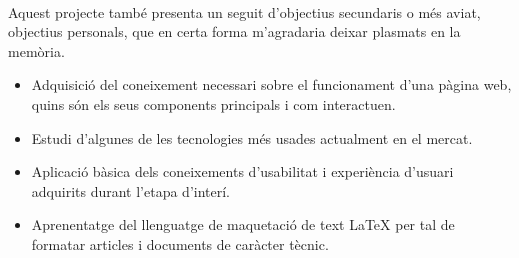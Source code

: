     \paragraph{}
    Aquest projecte també presenta un seguit d’objectius secundaris o més aviat, objectius personals, que en certa forma m’agradaria deixar plasmats en la memòria.

    \begin{itemize}
        \item Adquisició del coneixement necessari sobre el funcionament d'una pàgina web, quins són els seus components principals i com interactuen.
        \item Estudi d'algunes de les tecnologies més usades actualment en el mercat.
        \item Aplicació bàsica dels coneixements d’usabilitat i experiència d’usuari adquirits durant l’etapa d’interí.
        \item Aprenentatge del llenguatge de maquetació de text LaTeX per tal de formatar articles i documents de caràcter tècnic.
    \end{itemize}
